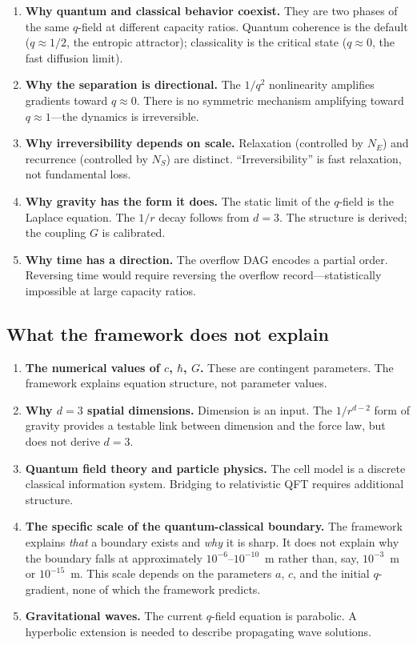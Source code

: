 \documentclass[reprint]{revtex4-2}
\begin{document}
\begin{enumerate}
\item \textbf{Why quantum and classical behavior coexist.} They are two phases of the same $q$-field at different capacity ratios. Quantum coherence is the default ($q\approx 1/2$, the entropic attractor); classicality is the critical state ($q\approx 0$, the fast diffusion limit).
\item \textbf{Why the separation is directional.} The $1/q^2$ nonlinearity amplifies gradients toward $q\approx 0$. There is no symmetric mechanism amplifying toward $q\approx 1$---the dynamics is irreversible.
\item \textbf{Why irreversibility depends on scale.} Relaxation (controlled by $N_E$) and recurrence (controlled by $N_S$) are distinct. ``Irreversibility'' is fast relaxation, not fundamental loss.
\item \textbf{Why gravity has the form it does.} The static limit of the $q$-field is the Laplace equation. The $1/r$ decay follows from $d=3$. The structure is derived; the coupling $G$ is calibrated.
\item \textbf{Why time has a direction.} The overflow DAG encodes a partial order. Reversing time would require reversing the overflow record---statistically impossible at large capacity ratios.
\end{enumerate}

\subsection{What the framework does not explain}

\begin{enumerate}
\item \textbf{The numerical values of $c$, $\hbar$, $G$.} These are contingent parameters. The framework explains equation structure, not parameter values.
\item \textbf{Why $d=3$ spatial dimensions.} Dimension is an input. The $1/r^{d-2}$ form of gravity provides a testable link between dimension and the force law, but does not derive $d=3$.
\item \textbf{Quantum field theory and particle physics.} The cell model is a discrete classical information system. Bridging to relativistic QFT requires additional structure.
\item \textbf{The specific scale of the quantum-classical boundary.} The framework explains \emph{that} a boundary exists and \emph{why} it is sharp. It does not explain why the boundary falls at approximately $10^{-6}$--$10^{-10}$~m rather than, say, $10^{-3}$~m or $10^{-15}$~m. This scale depends on the parameters $a$, $c$, and the initial $q$-gradient, none of which the framework predicts.
\item \textbf{Gravitational waves.} The current $q$-field equation is parabolic. A hyperbolic extension is needed to describe propagating wave solutions.
\end{enumerate}
\end{document}

